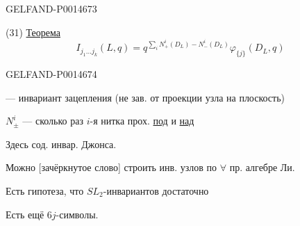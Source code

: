 \begin{GelfandAdjacentEvidence}{GELFAND-P001467}{3}


(31) \underline{Теорема}
\[
I_{j_1\ldots j_k}(L,q)=q^{\sum_i N_+^i(D_L)-N_-^i(D_L)}\varphi_{\{j\}}(D_L,q)
\]
\end{GelfandAdjacentEvidence}
\begin{GelfandAdjacentEvidence}{GELFAND-P001467}{4}


--- инвариант зацепления (не зав. от проекции узла на плоскость)

\(N_\pm^i\) --- сколько раз \(i\)-я нитка прох. \underline{под} и \underline{над}

Здесь сод. инвар. Джонса.

Можно [зачёркнутое слово] строить инв. узлов по \(\forall\) пр. алгебре Ли.
\end{GelfandAdjacentEvidence}


Есть гипотеза, что \(SL_2\)-инвариантов достаточно

Есть ещё \(6j\)-символы.


